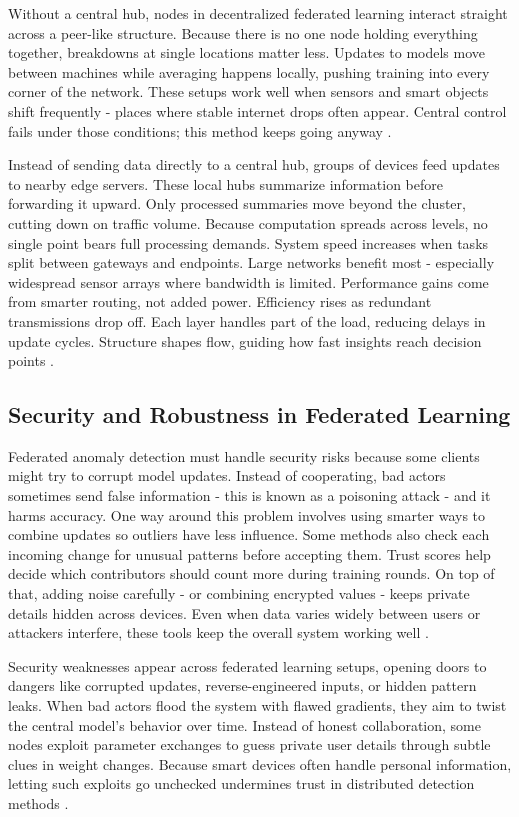 \documentclass[12pt]{article}
\begin{document}
Without a central hub, nodes in decentralized federated learning interact straight across a peer-like structure. Because there is no one node holding everything together, breakdowns at single locations matter less. Updates to models move between machines while averaging happens locally, pushing training into every corner of the network. These setups work well when sensors and smart objects shift frequently - places where stable internet drops often appear. Central control fails under those conditions; this method keeps going anyway \cite{paper6,paper7}.

Instead of sending data directly to a central hub, groups of devices feed updates to nearby edge servers. These local hubs summarize information before forwarding it upward. Only processed summaries move beyond the cluster, cutting down on traffic volume. Because computation spreads across levels, no single point bears full processing demands. System speed increases when tasks split between gateways and endpoints. Large networks benefit most - especially widespread sensor arrays where bandwidth is limited. Performance gains come from smarter routing, not added power. Efficiency rises as redundant transmissions drop off. Each layer handles part of the load, reducing delays in update cycles. Structure shapes flow, guiding how fast insights reach decision points \cite{paper2,paper3}.

\subsection{Security and Robustness in Federated Learning}

Federated anomaly detection must handle security risks because some clients might try to corrupt model updates. Instead of cooperating, bad actors sometimes send false information - this is known as a poisoning attack - and it harms accuracy. One way around this problem involves using smarter ways to combine updates so outliers have less influence. Some methods also check each incoming change for unusual patterns before accepting them. Trust scores help decide which contributors should count more during training rounds. On top of that, adding noise carefully - or combining encrypted values - keeps private details hidden across devices. Even when data varies widely between users or attackers interfere, these tools keep the overall system working well \cite{paper9,paper10}.

Security weaknesses appear across federated learning setups, opening doors to dangers like corrupted updates, reverse-engineered inputs, or hidden pattern leaks. When bad actors flood the system with flawed gradients, they aim to twist the central model's behavior over time. Instead of honest collaboration, some nodes exploit parameter exchanges to guess private user details through subtle clues in weight changes. Because smart devices often handle personal information, letting such exploits go unchecked undermines trust in distributed detection methods \cite{paper9,paper10}.
\end{document}
